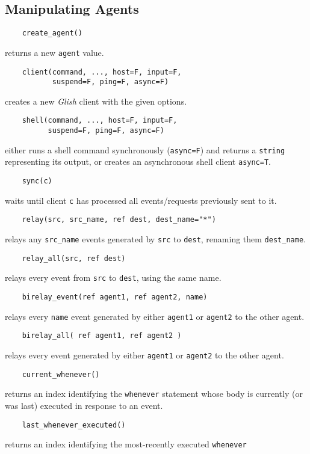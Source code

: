 \subsection{Manipulating Agents}

\begin{verbatim}
    create_agent()
\end{verbatim}
returns a new {\tt agent} value.
\begin{verbatim}
    client(command, ..., host=F, input=F,
           suspend=F, ping=F, async=F)
\end{verbatim}
creates a new {\em Glish} client with the given options.
\begin{verbatim}
    shell(command, ..., host=F, input=F,
          suspend=F, ping=F, async=F)
\end{verbatim}
either runs a shell command synchronously ({\tt async=F}) and returns
a {\tt string} representing its output, or creates an asynchronous
shell client {\tt async=T}.
\begin{verbatim}
    sync(c)
\end{verbatim}
waits until client {\tt c} has processed all events/requests previously
sent to it.
\begin{verbatim}
    relay(src, src_name, ref dest, dest_name="*")
\end{verbatim}
relays any {\tt src\_name} events generated by {\tt src} to {\tt dest},
renaming them {\tt dest\_name}.
\begin{verbatim}
    relay_all(src, ref dest)
\end{verbatim}
relays every event from {\tt src} to {\tt dest}, using the same name.
\begin{verbatim}
    birelay_event(ref agent1, ref agent2, name)
\end{verbatim}
relays every {\tt name} event generated by either {\tt agent1} or
{\tt agent2} to the other agent.
\begin{verbatim}
    birelay_all( ref agent1, ref agent2 )
\end{verbatim}
relays every event generated by either {\tt agent1} or {\tt agent2}
to the other agent.
\begin{verbatim}
    current_whenever()
\end{verbatim}
returns an index identifying the {\tt whenever} statement whose body
is currently (or was last) executed in response to an event.
\begin{verbatim}
    last_whenever_executed()
\end{verbatim}
returns an index identifying the most-recently executed {\tt whenever}

